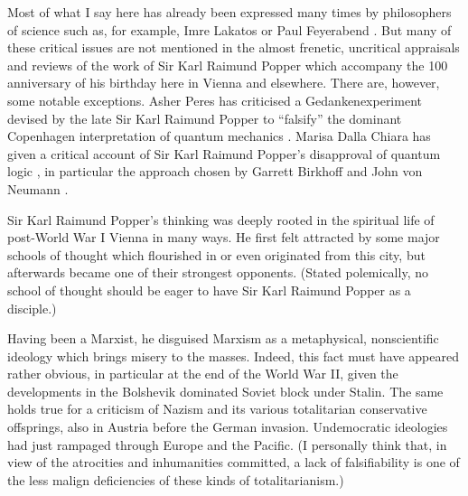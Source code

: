 Most of what I say here has already been expressed many times by
philosophers of science such as, for example, Imre Lakatos
\cite{lakatosch} or Paul Feyerabend \cite{feyerabend,feyerabend1}.
But many of these critical issues are not mentioned in the almost
frenetic, uncritical appraisals and reviews of the work of Sir Karl Raimund Popper
which accompany the  100 anniversary of his birthday here in Vienna and elsewhere.
There are, however, some notable exceptions. Asher Peres has criticised
a Gedankenexperiment
devised by the late Sir Karl Raimund Popper to ``falsify'' the dominant Copenhagen interpretation
of quantum mechanics \cite{2002-peres}.
Marisa Dalla Chiara has given a critical account of Sir Karl Raimund Popper's
disapproval of quantum logic \cite{dalla-2002}, in particular the approach chosen by
Garrett Birkhoff and John von  Neumann \cite{birkhoff-36}.

Sir Karl Raimund Popper's thinking was deeply rooted in
the spiritual life of post-World War I Vienna in many ways.
He first felt attracted by some major schools of thought
which flourished in or even originated from this city,
but afterwards became one of their strongest opponents.
(Stated polemically, no school of thought should be eager to have Sir Karl Raimund Popper as a disciple.)

Having been a Marxist, he disguised Marxism as a metaphysical,
nonscientific ideology which brings misery to the masses.
Indeed, this fact must have appeared rather obvious, in particular
at the end of the World War II,
given the developments in the Bolshevik dominated Soviet block under
Stalin.
The same holds true for a criticism of Nazism and its various totalitarian
conservative offsprings, also in Austria before the German invasion.
Undemocratic ideologies had just rampaged through Europe and the Pacific.
(I personally think that, in view of the atrocities and inhumanities committed,
a lack of falsifiability is one of the less malign deficiencies of these kinds of totalitarianism.)

